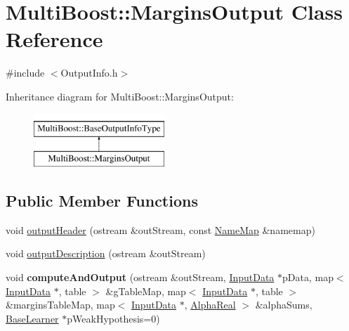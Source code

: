 \hypertarget{classMultiBoost_1_1MarginsOutput}{\section{Multi\-Boost\-:\-:Margins\-Output Class Reference}
\label{classMultiBoost_1_1MarginsOutput}
}


{\ttfamily \#include $<$Output\-Info.\-h$>$}

Inheritance diagram for Multi\-Boost\-:\-:Margins\-Output\-:\begin{figure}[H]
\begin{center}
\leavevmode
\includegraphics[height=2.000000cm]{classMultiBoost_1_1MarginsOutput}
\end{center}
\end{figure}
\subsection*{Public Member Functions}
\begin{DoxyCompactItemize}
\item 
void \hyperlink{classMultiBoost_1_1MarginsOutput_a657597f9a22c2628f8fb1110e1625a8c}{output\-Header} (ostream \&out\-Stream, const \hyperlink{classMultiBoost_1_1NameMap}{Name\-Map} \&namemap)
\item 
void \hyperlink{classMultiBoost_1_1MarginsOutput_a18adec2c41eb2e097ea0bbeef83a9d6d}{output\-Description} (ostream \&out\-Stream)
\item 
\hypertarget{classMultiBoost_1_1MarginsOutput_ad8d9e5148ac4eefdba75e2eafdb1b8fa}{void {\bfseries compute\-And\-Output} (ostream \&out\-Stream, \hyperlink{classMultiBoost_1_1InputData}{Input\-Data} $\ast$p\-Data, map$<$ \hyperlink{classMultiBoost_1_1InputData}{Input\-Data} $\ast$, table $>$ \&g\-Table\-Map, map$<$ \hyperlink{classMultiBoost_1_1InputData}{Input\-Data} $\ast$, table $>$ \&margins\-Table\-Map, map$<$ \hyperlink{classMultiBoost_1_1InputData}{Input\-Data} $\ast$, \hyperlink{Defaults_8h_a80184c4fd10ab70a1a17c5f97dcd1563}{Alpha\-Real} $>$ \&alpha\-Sums, \hyperlink{classMultiBoost_1_1BaseLearner}{Base\-Learner} $\ast$p\-Weak\-Hypothesis=0)}\label{classMultiBoost_1_1MarginsOutput_ad8d9e5148ac4eefdba75e2eafdb1b8fa}

\end{DoxyCompactItemize}
